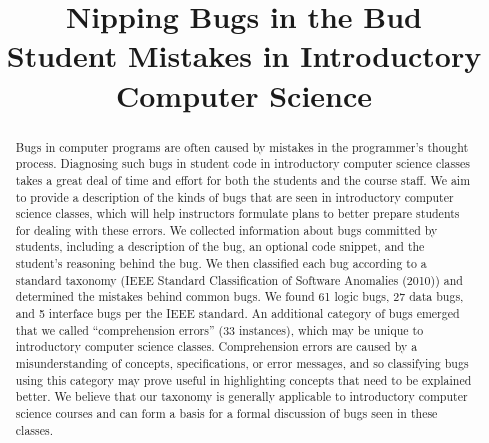 \documentclass{sig-alternate}
\begin{document}
\title{Nipping Bugs in the Bud\\ Student Mistakes in Introductory Computer Science}
\author{
\alignauthor
}
\maketitle

\setcounter{page}{1}

\def\numlogicIEEE{64 }
\def\numdataIEEE{30 }
\def\numinterfaceIEEE{5 }
\def\numotherIEEE{27 }

\def\numlogic{61 }
\def\numdata{27 }
\def\numinterface{5 }
\def\numcomp{33 }
\def\numtotal{126 }
\def\numedge{31 }

\begin{abstract}
Bugs in computer programs are often caused by mistakes in the programmer's thought process. Diagnosing such bugs in student code in introductory computer science classes takes a great deal of time and effort for both the students and the course staff. We aim to provide a description of the kinds of bugs that are seen in introductory computer science classes, which will help instructors formulate plans to better prepare students for dealing with these errors. We collected information about bugs committed by students, including a description of the bug, an optional code snippet, and the student's reasoning behind the bug. We then classified each bug according to a standard taxonomy (IEEE Standard Classification of Software Anomalies (2010)) and determined the mistakes behind common bugs. We found \numlogic logic bugs, \numdata data bugs, and \numinterface interface bugs per the IEEE standard. An additional category of bugs emerged that we called ``comprehension errors'' (\numcomp instances), which may be unique to introductory computer science classes. Comprehension errors are caused by a misunderstanding of concepts, specifications, or error messages, and so classifying bugs using this category may prove useful in highlighting concepts that need to be explained better. We believe that our taxonomy is generally applicable to introductory computer science courses and can form a basis for a formal discussion of bugs seen in these classes.

\end{abstract}
\end{document}
